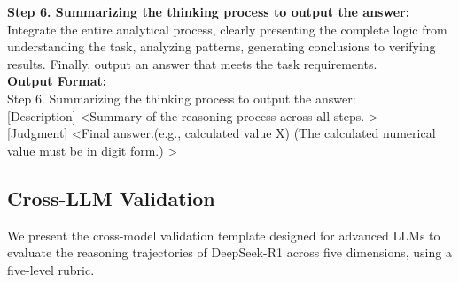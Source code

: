 \documentclass{article}
\theoremstyle{plain}
\theoremstyle{definition}
\theoremstyle{remark}
\begin{document}
\begin{prompt}
\textbf{Step 6. Summarizing the thinking process to output the answer: }\\
Integrate the entire analytical process, clearly presenting the complete logic from understanding the task, analyzing patterns, generating conclusions to verifying results. Finally, output an answer that meets the task requirements.  \\
\textbf{Output Format:} \\
Step 6. Summarizing the thinking process to output the answer: \\
{[Description] \textless Summary of the reasoning process across all steps. \textgreater} \\
{[Judgment] \textless Final answer.(e.g., calculated value X) (The calculated numerical value must be in digit form.) \textgreater} \\
\end{prompt}



\subsection{Cross-LLM Validation}
\label{apdx:cross_val_tplt}

We present the cross-model validation template designed for advanced LLMs to evaluate the reasoning trajectories of DeepSeek-R1 across five dimensions, using a five-level rubric.
\end{document}
